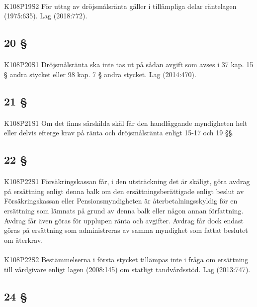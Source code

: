 \documentclass[a4paper,notitlepage,openany,10pt]{book}
\begin{document}
\paragraph*{}
{\tiny K108P19S2}
För uttag av dröjsmålsränta gäller i tillämpliga delar räntelagen (1975:635).
Lag (2018:772).
\subsection*{20 §}
\paragraph*{}
{\tiny K108P20S1}
Dröjsmålsränta ska inte tas ut på sådan avgift som avses i 37 kap. 15 § andra stycket eller 98 kap. 7 § andra stycket.
Lag (2014:470).
\subsection*{21 §}
\paragraph*{}
{\tiny K108P21S1}
Om det finns särskilda skäl får den handläggande myndigheten helt eller delvis efterge krav på ränta och dröjsmålsränta enligt 15-17 och 19 §§.
\subsection*{22 §}
\paragraph*{}
{\tiny K108P22S1}
Försäkringskassan får, i den utsträckning det är skäligt, göra avdrag på ersättning enligt denna balk om den ersättningsberättigade enligt beslut av Försäkringskassan eller Pensionsmyndigheten är återbetalningsskyldig för en ersättning som lämnats på grund av denna balk eller någon annan författning. Avdrag får även göras för upplupen ränta och avgifter. Avdrag får dock endast göras på ersättning som administreras av samma myndighet som fattat beslutet om återkrav.
\paragraph*{}
{\tiny K108P22S2}
Bestämmelserna i första stycket tillämpas inte i fråga om ersättning till vårdgivare enligt lagen (2008:145) om statligt tandvårdsstöd.
Lag (2013:747).
\subsection*{24 §}
\end{document}
